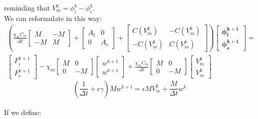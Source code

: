 \documentclass[a4paper,11pt]{article}
\begin{document}
reminding that $V_m^k=\phi_i^k-\phi_e^k$.\newline
\vspace{3mm} \\
We can reformulate in this way:
\begin{equation}
\begin{gathered}
\left( \frac{\chi_m C_m}{\Delta t} \begin{bmatrix} M & -M \\ -M & M \end{bmatrix} + \begin{bmatrix} A_i & 0 \\ 0 & A_e \end{bmatrix} + 
\begin{bmatrix}
C(V_m^k) & -C(V_m^k) \\ -C(V_m^k) & C(V_m^k)
\end{bmatrix}\right)
\begin{bmatrix} \bm{\phi_i^{k+1}} \\ \bm{\phi_e^{k+1}} \end{bmatrix} = 
\\
\begin{bmatrix} F_i^{k+1} \\ F_e^{k+1} \end{bmatrix} 
- \chi_m \begin{bmatrix}M & 0 \\ 0 & -M \end{bmatrix}
\begin{bmatrix} w^{k+1} \\ w^{k+1} \end{bmatrix}
+ \frac{\chi_m C_m}{\Delta t} \begin{bmatrix}M & 0 \\ 0 & -M\end{bmatrix}
\begin{bmatrix} V_m^{k} \\ V_m^{k} \end{bmatrix}
\end{gathered}
\end{equation}
\begin{equation}
(\frac{1}{\Delta t}+\epsilon \gamma)M w^{k+1}=\epsilon M V_m^k+\frac{M}{\Delta t} w^k
\end{equation}
\vspace{5mm} \\
If we define:
\end{document}
